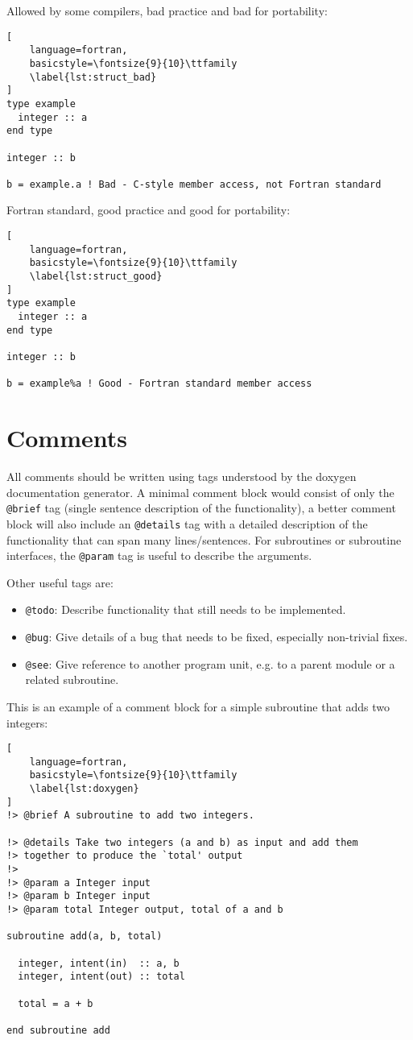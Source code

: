 \documentclass[11pt]{article}
\begin{document}
Allowed by some compilers, bad practice and bad for portability:
\begin{lstlisting}[
	language=fortran,
    basicstyle=\fontsize{9}{10}\ttfamily
    \label{lst:struct_bad}
]
type example
  integer :: a
end type

integer :: b

b = example.a ! Bad - C-style member access, not Fortran standard
\end{lstlisting}

Fortran standard, good practice and good for portability:
\begin{lstlisting}[
	language=fortran,
    basicstyle=\fontsize{9}{10}\ttfamily
    \label{lst:struct_good}
]
type example
  integer :: a
end type

integer :: b

b = example%a ! Good - Fortran standard member access
\end{lstlisting}

\section{Comments}
All comments should be written using tags understood by the doxygen documentation generator. A minimal comment
block would consist of only the \texttt{@brief} tag (single sentence description of the functionality), a better comment
block will also include an \texttt{@details} tag with a detailed description of the functionality that can span many 
lines/sentences. For subroutines or subroutine interfaces, the \texttt{@param} tag is useful to describe the arguments.

Other useful tags are:
\begin{itemize}
  \item \texttt{@todo}: Describe functionality that still needs to be implemented.
  \item \texttt{@bug}: Give details of a bug that needs to be fixed, especially non-trivial fixes.
  \item \texttt{@see}: Give reference to another program unit, e.g. to a parent module or a related subroutine.
\end{itemize}


This is an example of a comment block for a simple subroutine that adds two integers:

\begin{lstlisting}[
	language=fortran,
    basicstyle=\fontsize{9}{10}\ttfamily
    \label{lst:doxygen}
]
!> @brief A subroutine to add two integers.

!> @details Take two integers (a and b) as input and add them
!> together to produce the `total' output
!> 
!> @param a Integer input
!> @param b Integer input
!> @param total Integer output, total of a and b

subroutine add(a, b, total)

  integer, intent(in)  :: a, b
  integer, intent(out) :: total

  total = a + b

end subroutine add
\end{lstlisting}
\end{document}
